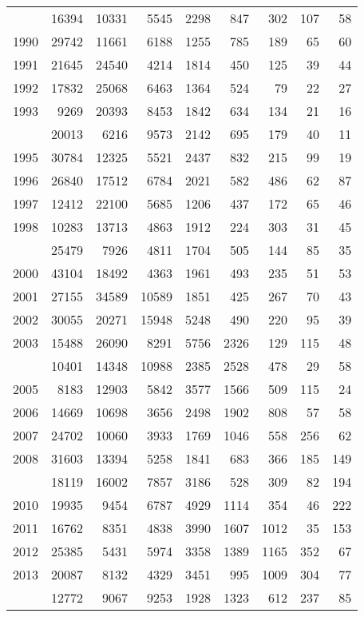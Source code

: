\documentclass[
]{article}
\begin{document}
\begin{longtable}[t]{lrrrrrrrr}
\endfoot
\bottomrule
\endlastfoot
1989 & 16394 & 10331 & 5545 & 2298 & 847 & 302 & 107 & 58\\
1990 & 29742 & 11661 & 6188 & 1255 & 785 & 189 & 65 & 60\\
1991 & 21645 & 24540 & 4214 & 1814 & 450 & 125 & 39 & 44\\
1992 & 17832 & 25068 & 6463 & 1364 & 524 & 79 & 22 & 27\\
1993 & 9269 & 20393 & 8453 & 1842 & 634 & 134 & 21 & 16\\
\addlinespace
1994 & 20013 & 6216 & 9573 & 2142 & 695 & 179 & 40 & 11\\
1995 & 30784 & 12325 & 5521 & 2437 & 832 & 215 & 99 & 19\\
1996 & 26840 & 17512 & 6784 & 2021 & 582 & 486 & 62 & 87\\
1997 & 12412 & 22100 & 5685 & 1206 & 437 & 172 & 65 & 46\\
1998 & 10283 & 13713 & 4863 & 1912 & 224 & 303 & 31 & 45\\
\addlinespace
1999 & 25479 & 7926 & 4811 & 1704 & 505 & 144 & 85 & 35\\
2000 & 43104 & 18492 & 4363 & 1961 & 493 & 235 & 51 & 53\\
2001 & 27155 & 34589 & 10589 & 1851 & 425 & 267 & 70 & 43\\
2002 & 30055 & 20271 & 15948 & 5248 & 490 & 220 & 95 & 39\\
2003 & 15488 & 26090 & 8291 & 5756 & 2326 & 129 & 115 & 48\\
\addlinespace
2004 & 10401 & 14348 & 10988 & 2385 & 2528 & 478 & 29 & 58\\
2005 & 8183 & 12903 & 5842 & 3577 & 1566 & 509 & 115 & 24\\
2006 & 14669 & 10698 & 3656 & 2498 & 1902 & 808 & 57 & 58\\
2007 & 24702 & 10060 & 3933 & 1769 & 1046 & 558 & 256 & 62\\
2008 & 31603 & 13394 & 5258 & 1841 & 683 & 366 & 185 & 149\\
\addlinespace
2009 & 18119 & 16002 & 7857 & 3186 & 528 & 309 & 82 & 194\\
2010 & 19935 & 9454 & 6787 & 4929 & 1114 & 354 & 46 & 222\\
2011 & 16762 & 8351 & 4838 & 3990 & 1607 & 1012 & 35 & 153\\
2012 & 25385 & 5431 & 5974 & 3358 & 1389 & 1165 & 352 & 67\\
2013 & 20087 & 8132 & 4329 & 3451 & 995 & 1009 & 304 & 77\\
\addlinespace
2014 & 12772 & 9067 & 9253 & 1928 & 1323 & 612 & 237 & 85\\

\end{longtable}
\end{document}
